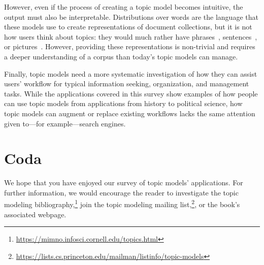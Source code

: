 However, even if the process of creating a topic model becomes
intuitive, the output must also be interpretable.  Distributions
over words are the language that these models use to create
representations of document collections, but it is not how users think
about topics: they would much rather have phrases~\citep{mei-07},
sentences~\citep{smith-16}, or pictures~\citep{lau-14}.  However,
providing these representations is non-trivial and requires a deeper
understanding of a corpus than today's topic models can manage.

Finally, topic models need a more systematic investigation of how
they can assist users' workflow for typical information seeking,
organization, and management tasks.  While the applications covered in
this survey show examples of how people can use topic models from
applications from history to political science, how topic models can
augment or replace existing workflows lacks the same attention given
to---for example---search engines.

\section{Coda}

We hope that you have enjoyed our survey of topic models'
applications.  For further information, we would encourage the reader to
investigate the topic modeling
bibliography,\footnote{\url{https://mimno.infosci.cornell.edu/topics.html}}
join the topic modeling mailing
list,\footnote{\url{https://lists.cs.princeton.edu/mailman/listinfo/topic-models}},
or the book's associated webpage.
